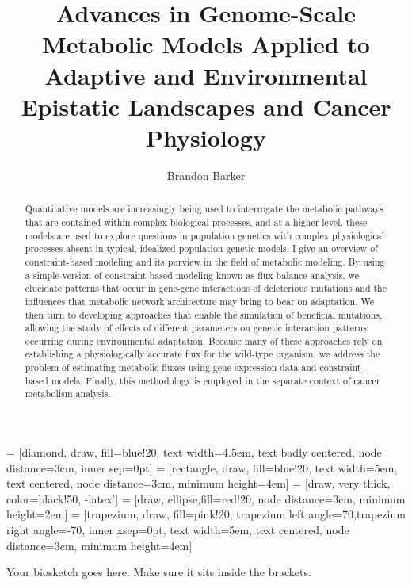 \documentclass[phd,tocprelim]{cornell}
\title {Advances in Genome-Scale Metabolic Models Applied to Adaptive and Environmental Epistatic Landscapes and Cancer Physiology}
\author {Brandon Barker}
\theoremstyle{break}
\theoremstyle{empty}
\begin{document}
 = [diamond, draw, fill=blue!20,
    text width=4.5em, text badly centered, node distance=3cm, inner sep=0pt]
 = [rectangle, draw, fill=blue!20,
    text width=5em, text centered, node distance=3cm, minimum height=4em]
 = [draw, very thick, color=black!50, -latex']
 = [draw, ellipse,fill=red!20, node distance=3cm,
    minimum height=2em]
 = [trapezium, draw, fill=pink!20,
    trapezium left angle=70,trapezium right angle=-70, inner xsep=0pt,
    text width=5em, text centered, node distance=3cm, minimum height=4em]


\maketitle
\makecopyright

\begin{abstract}

Quantitative models are increasingly being used to interrogate the
metabolic pathways that are contained within complex biological
processes, and at a higher level, these models are used to explore
questions in population genetics with complex physiological processes
absent in typical, idealized population genetic models.  I give an
overview of constraint-based modeling and its purview in the field of
metabolic modeling. By using a simple version of constraint-based
modeling known as flux balance analysis, we elucidate patterns that
occur in gene-gene interactions of deleterious mutations and the
influences that metabolic network architecture may bring to bear on
adaptation. We then turn to developing approaches that enable the
simulation of beneficial mutations, allowing the study of effects of
different parameters on genetic interaction patterns occurring during
environmental adaptation. Because many of these approaches rely on
establishing a physiologically accurate flux for the wild-type
organism, we address the problem of estimating metabolic fluxes using
gene expression data and constraint-based models. Finally, this
methodology is employed in the separate context of cancer metabolism
analysis.
\end{abstract}

\begin{biosketch}
Your biosketch goes here. Make sure it sits inside
the brackets.
\end{biosketch}
\end{document}

